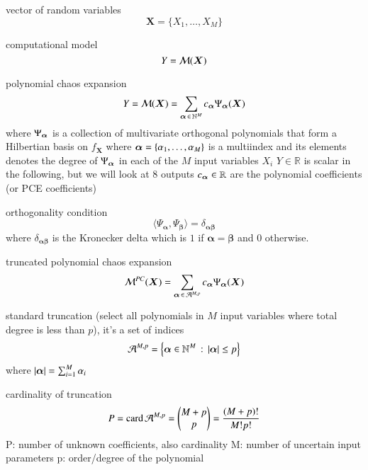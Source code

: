 vector of random variables
\begin{equation}
    \bm{X} = \{X_1, \dots , X_M\}
\end{equation}

computational model
\begin{equation}
    Y = \mathcal{M} ( \bm X )
\end{equation}

polynomial chaos expansion
\begin{equation}
    Y = \mathcal{M} ( \bm X ) = \sum_{{\bm{\alpha}} \,\in\, \mathbb{N}^M} c_{{\bm{\alpha}}} \Psi_{{\bm{\alpha}}} (\bm X)
\end{equation}
where $\Psi_{\bm{\alpha}}$ is a collection of multivariate orthogonal polynomials that form a Hilbertian basis on $f_{\bm X}$
where ${\bm{\alpha}} = \{\alpha_1,\dots,\alpha_M\}$ is a multiindex and its elements
denotes the degree of $\Psi_{\bm{\alpha}}$ in each of the $M$ input variables $X_i$
$Y\in\mathbb{R}$ is scalar in the following, but we will look at 8 outputs
$c_{\bm{\alpha}} \in \mathbb{R}$ are the polynomial coefficients (or PCE coefficients)

orthogonality condition
\begin{equation}
    \langle \Psi_{\bm\alpha}, \Psi_{\bm\beta} \rangle = \delta_{\bm{\alpha\beta}}
\end{equation}
where $\delta_{\bm{\alpha\beta}}$ is the Kronecker delta which is $1$ if $\bm\alpha=\bm\beta$ and $0$ otherwise.

truncated polynomial chaos expansion
\begin{equation}
    \mathcal{M}^{PC}(\bm X) = \sum_{{\bm{\alpha}} \,\in\, \mathcal{A}^{M,p}} c_{\bm{\alpha}} \Psi_{\bm{\alpha}}(\bm X)
\end{equation}

standard truncation (select all polynomials in $M$ input variables where total degree is less than $p$), it's a set of indices
\begin{equation}
    \mathcal{A}^{M,p} = \left\{{\bm{\alpha}} \in \mathbb{N}^M \,:\, \left|{\bm{\alpha}}\right| \leq p\right\}
\end{equation}
where $\left|{\bm{\alpha}}\right| = \sum_{i=1}^M \alpha_i$

cardinality of truncation
\begin{equation}
    P = \text{card}\, \mathcal{A}^{M,p} = \left(\begin{matrix}
        M+p \\
        p
    \end{matrix}\right) = \frac{(M+p)!}{M!p!}
\end{equation}
P: number of unknown coefficients, also cardinality
M: number of uncertain input parameters
p: order/degree of the polynomial

